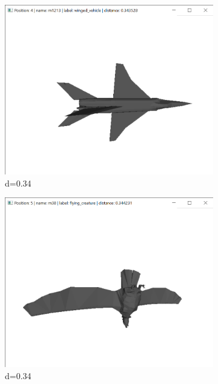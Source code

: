 \documentclass{bigdata}
\begin{document}
\begin{figure}[h!]
\begin{subfigure}[b]{0.09\linewidth}
    \includegraphics[width=\linewidth]{Pictures/Evaluation/m42/pos4.png}
    \caption*{d=0.34}
  \end{subfigure}
  \begin{subfigure}[b]{0.09\linewidth}
    \includegraphics[width=\linewidth]{Pictures/Evaluation/m42/pos5.png}
    \caption*{d=0.34}
  \end{subfigure}
  \begin{subfigure}[b]{0.09\linewidth}

\end{subfigure}
\end{figure}
\end{document}
